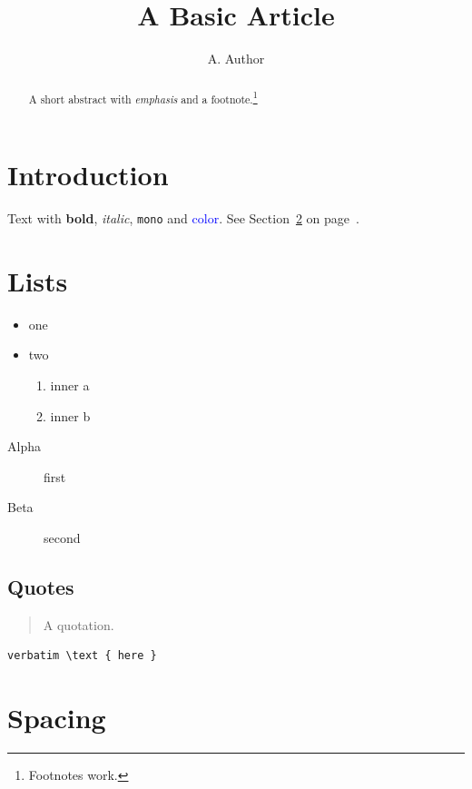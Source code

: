 \documentclass[11pt,a4paper]{article}
\title{A Basic Article}\author{A. Author}\date{}
\newcommand{\term}[1]{\emph{#1}}
\begin{document}
\maketitle
\begin{abstract}A short abstract with \term{emphasis} and a footnote.\footnote{Footnotes work.}\end{abstract}
\tableofcontents
\section{Introduction}\label{sec:intro}
Text with \textbf{bold}, \textit{italic}, \texttt{mono} and \textcolor{blue}{color}. See Section~\ref{sec:lists} on page~\pageref{sec:lists}.
\section{Lists}\label{sec:lists}
\begin{itemize}[leftmargin=*]\item one \item two \begin{enumerate}[label=(\alph*)]\item inner a \item inner b\end{enumerate}\end{itemize}
\begin{description}\item[Alpha] first \item[Beta] second\end{description}
\subsection{Quotes}
\begin{quote}A quotation.\end{quote}
\begin{verbatim}
verbatim \text { here }
\end{verbatim}
\section{Spacing}
\end{document}
